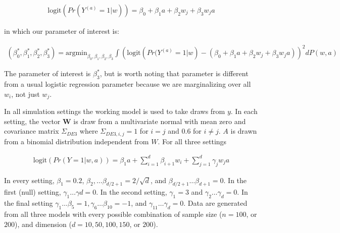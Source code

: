 \documentclass{article}
\newcommand{\sh}{\textcolor{red}}
\begin{document}
\begin{align*}
\text{logit}\left(Pr(Y^{(a)} = 1 | w)\right) = \beta_0 + \beta_1 a + \beta_2 w_j + \beta_3 w_j a
\end{align*}

in which our parameter of interest is:

\begin{align*}
(\beta_0^*, \beta_1^*, \beta_2^*, \beta_3^*) = \text{argmin}_{\beta_0, \beta_1, \beta_2, \beta_3}\int\left(\text{logit}\left(Pr(Y^{(a)} = 1 | w\right) - (\beta_0 + \beta_1 a + \beta_2w_j + \beta_3 w_j a) \right)^2 dP(w, a)
\end{align*}

The parameter of interest is $\beta_3^*$, but is worth noting that parameter is different from a usual logistic regression parameter because we are marginalizing over all $w_i$, not just $w_j$.

In all simulation settings the working model is used to take draws from $y$. In each setting, the vector $\boldsymbol{W}$ is draw from a multivariate normal with mean zero and covariance matrix $\Sigma_{DE3}$ where $\Sigma_{DE3, i, j} = 1$ for $i = j$ and $0.6$ for $i \neq j$.  $A$ is drawn from a binomial distribution independent from $W$.  For all three settings 

\begin{align*}
	\text{logit}\left(Pr(Y = 1 | w, a)\right) = \beta_1 a + \sum_{i = 1}^{d} \beta_{i + 1} w_i + \sum_{j = 1}^d \gamma_{j} w_j a
\end{align*}

In every setting, $\beta_1 = 0.2$, $\beta_2, \dots \beta_{d/2 + 1} = 2/\sqrt{d}$, and $\beta_{d/2 + 1} \dots \beta_{d + 1} = 0$.  In the first (null) setting, $\gamma_{1} \dots \gamma{d} = 0$.  In the second setting, $\gamma_{1} = 3$ and $\gamma_{2} \dots \gamma_{d} = 0$.  In the final setting $\gamma_{1} \dots \beta_{5} = 1, \gamma_{6} \dots \beta_{10} = -1$, and $\gamma_{11} \dots \gamma_{d} = 0$.
Data are generated from all three models with every possible combination of sample size ($n = 100$, or $200$), and dimension ($d = 10, 50, 100, 150$, or $200$).


\end{document}
